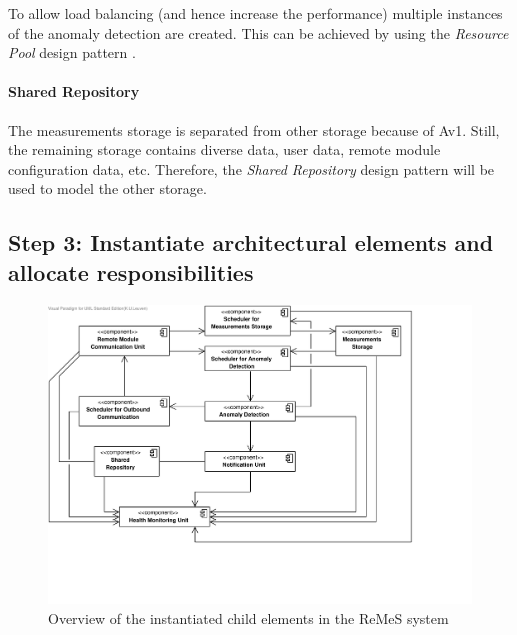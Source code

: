 \npar To allow load balancing (and hence increase the performance) multiple
instances of the anomaly detection are created. This can be achieved by using
the \emph{Resource Pool} design pattern \citep[see][p.~503]{Buschmann:07}. 

\paragraph{Shared Repository}

\npar The measurements storage is separated from other storage because of Av1.
Still, the remaining storage contains diverse data, user data, remote module
configuration data, etc. Therefore, the \emph{Shared Repository} design pattern
\citep[see][p.~202]{Buschmann:07} will be used to model the other storage.

\subsection{Step 3: Instantiate architectural elements and allocate responsibilities}
\label{add:it1/elements}

\begin{figure}[H]
	\begin{centering}
		\includegraphics[height=\textwidth,angle=90]{figs/add-it1-elements.pdf}
		\caption{Overview of the instantiated child elements in the ReMeS system}
		\label{fig:it1/elements}
	\end{centering}
\end{figure}

